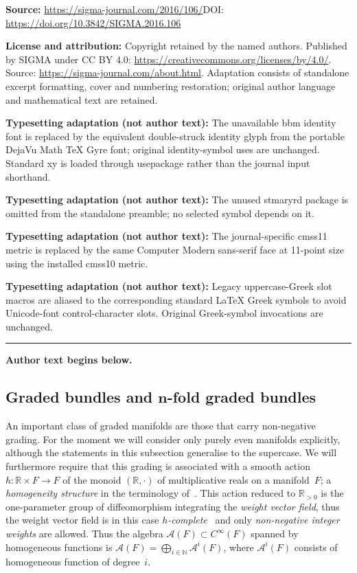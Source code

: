 \documentclass[11pt]{article}
\newcommand{\R}{{\mathbb R}}
\newcommand{\ti}{\times}
\numberwithin{equation}{section}
\begin{document}
\noindent\textbf{Source:} \url{https://sigma-journal.com/2016/106/}\quad DOI: \url{https://doi.org/10.3842/SIGMA.2016.106}\par
\noindent\textbf{License and attribution:} Copyright retained by the named authors. Published by SIGMA under CC BY 4.0: \url{https://creativecommons.org/licenses/by/4.0/}. Source: \url{https://sigma-journal.com/about.html}. Adaptation consists of standalone excerpt formatting, cover and numbering restoration; original author language and mathematical text are retained.\par
\noindent\textbf{Typesetting adaptation (not author text):} The unavailable bbm identity font is replaced by the equivalent double-struck identity glyph from the portable DejaVu Math TeX Gyre font; original identity-symbol uses are unchanged. Standard xy is loaded through usepackage rather than the journal input shorthand.\par
\noindent\textbf{Typesetting adaptation (not author text):} The unused stmaryrd package is omitted from the standalone preamble; no selected symbol depends on it.\par
\noindent\textbf{Typesetting adaptation (not author text):} The journal-specific cmss11 metric is replaced by the same Computer Modern sans-serif face at 11-point size using the installed cmss10 metric.\par
\noindent\textbf{Typesetting adaptation (not author text):} Legacy uppercase-Greek slot macros are aliased to the corresponding standard LaTeX Greek symbols to avoid Unicode-font control-character slots. Original Greek-symbol invocations are unchanged.\par
\medskip\hrule\medskip\noindent\textbf{Author text begins below.}\par
\setcounter{section}{1}
\setcounter{subsection}{1}
\setcounter{subsubsection}{0}
\setcounter{Theorem}{1}
\setcounter{equation}{0}
\subsection[Graded bundles and $n$-fold graded bundles]{Graded bundles and $\boldsymbol{n}$-fold graded bundles}

An important class of graded manifolds are those that carry non-negative grading. For the moment we will consider only purely even manifolds explicitly, although the statements in this subsection generalise to the supercase. We will furthermore require that this grading is associated with a smooth action $h\colon \R\ti F\to F$ of the monoid $(\R,\cdot)$ of multiplicative reals on a mani\-fold~$F$; a \emph{homogeneity structure} in the terminology of~\cite{JG_MR_higher_vb}. This action reduced to $\R_{>0}$ is the one-parameter group of dif\/feomorphism integrating the \emph{weight vector field}, thus the weight vector f\/ield is in this case \emph{$h$-complete}~\cite{Grabowski2013} and only \emph{non-negative integer weights} are allowed. Thus the algebra $\mathcal{A}(F)\subset C^\infty(F)$ spanned by homogeneous functions is $\mathcal{A}(F) = \bigoplus_{i \in \mathbb{N}}\mathcal{A}^{i}(F)$, where $\mathcal{A}^{i}(F)$ consists of homogeneous function of degree~$i$.
\end{document}
